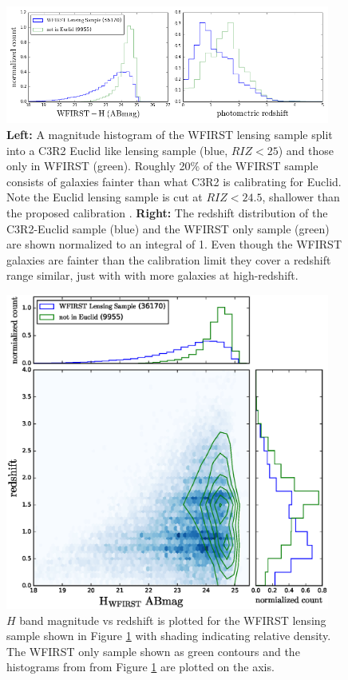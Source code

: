 \begin{figure} 
\centering
\includegraphics[trim=0cm 0cm 0cm 0cm, clip,width=0.95\textwidth] {./plots/histogram_wfirst_notEuclid.png}
\caption{{\bf Left:} A magnitude histogram of the WFIRST lensing sample split into a C3R2 Euclid like lensing sample (blue, $RIZ<25$) and those only in WFIRST (green).  Roughly 20\% of the WFIRST sample consists of galaxies fainter than what C3R2 is calibrating for Euclid.  Note the Euclid lensing sample is cut at $RIZ<24.5$, shallower than the proposed calibration \citep{Masters2015}.  {\bf Right:} The redshift distribution of the C3R2-Euclid sample (blue) and the WFIRST only sample (green) are shown normalized to an integral of 1. Even though the WFIRST galaxies are fainter than the calibration limit they cover a redshift range similar, just with with more galaxies at high-redshift.   }
\label{fig:EuclidVsWFIRST}
\end{figure}

\begin{figure} 
\centering
\includegraphics[trim=0cm 0cm 0cm 0cm, clip,width=0.95\textwidth] {./plots/redshift_magnitude.eps}
\caption{$H$ band magnitude vs redshift is plotted for the WFIRST lensing sample shown in Figure \ref{fig:EuclidVsWFIRST} with shading indicating relative density.  The WFIRST only sample shown as green contours and the histograms from from Figure \ref{fig:EuclidVsWFIRST} are plotted on the axis.   }
\label{fig:EuclidVsWFIRST2}
\end{figure}

